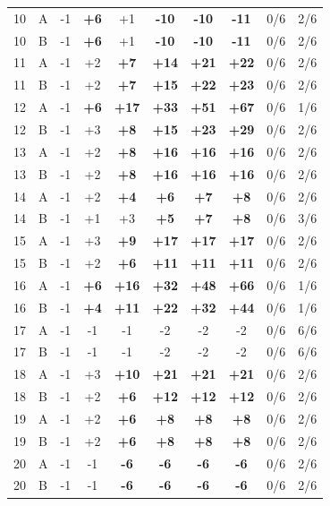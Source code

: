 \begin{table}[htbp]
\begin{tabular}{clcccccccc}
10 & A & -1 & \textbf{+6} & +1 & \textbf{-10} & \textbf{-10} & \textbf{-11} & 0/6 & 2/6 \\
10 & B & -1 & \textbf{+6} & +1 & \textbf{-10} & \textbf{-10} & \textbf{-11} & 0/6 & 2/6 \\
11 & A & -1 & +2 & \textbf{+7} & \textbf{+14} & \textbf{+21} & \textbf{+22} & 0/6 & 2/6 \\
11 & B & -1 & +2 & \textbf{+7} & \textbf{+15} & \textbf{+22} & \textbf{+23} & 0/6 & 2/6 \\
12 & A & -1 & \textbf{+6} & \textbf{+17} & \textbf{+33} & \textbf{+51} & \textbf{+67} & 0/6 & 1/6 \\
12 & B & -1 & +3 & \textbf{+8} & \textbf{+15} & \textbf{+23} & \textbf{+29} & 0/6 & 2/6 \\
13 & A & -1 & +2 & \textbf{+8} & \textbf{+16} & \textbf{+16} & \textbf{+16} & 0/6 & 2/6 \\
13 & B & -1 & +2 & \textbf{+8} & \textbf{+16} & \textbf{+16} & \textbf{+16} & 0/6 & 2/6 \\
14 & A & -1 & +2 & \textbf{+4} & \textbf{+6} & \textbf{+7} & \textbf{+8} & 0/6 & 2/6 \\
14 & B & -1 & +1 & +3 & \textbf{+5} & \textbf{+7} & \textbf{+8} & 0/6 & 3/6 \\
15 & A & -1 & +3 & \textbf{+9} & \textbf{+17} & \textbf{+17} & \textbf{+17} & 0/6 & 2/6 \\
15 & B & -1 & +2 & \textbf{+6} & \textbf{+11} & \textbf{+11} & \textbf{+11} & 0/6 & 2/6 \\
16 & A & -1 & \textbf{+6} & \textbf{+16} & \textbf{+32} & \textbf{+48} & \textbf{+66} & 0/6 & 1/6 \\
16 & B & -1 & \textbf{+4} & \textbf{+11} & \textbf{+22} & \textbf{+32} & \textbf{+44} & 0/6 & 1/6 \\
17 & A & -1 & -1 & -1 & -2 & -2 & -2 & 0/6 & 6/6 \\
17 & B & -1 & -1 & -1 & -2 & -2 & -2 & 0/6 & 6/6 \\
18 & A & -1 & +3 & \textbf{+10} & \textbf{+21} & \textbf{+21} & \textbf{+21} & 0/6 & 2/6 \\
18 & B & -1 & +2 & \textbf{+6} & \textbf{+12} & \textbf{+12} & \textbf{+12} & 0/6 & 2/6 \\
19 & A & -1 & +2 & \textbf{+6} & \textbf{+8} & \textbf{+8} & \textbf{+8} & 0/6 & 2/6 \\
19 & B & -1 & +2 & \textbf{+6} & \textbf{+8} & \textbf{+8} & \textbf{+8} & 0/6 & 2/6 \\
20 & A & -1 & -1 & \textbf{-6} & \textbf{-6} & \textbf{-6} & \textbf{-6} & 0/6 & 2/6 \\
20 & B & -1 & -1 & \textbf{-6} & \textbf{-6} & \textbf{-6} & \textbf{-6} & 0/6 & 2/6 \\
\bottomrule
\end{tabular}
\end{table}
